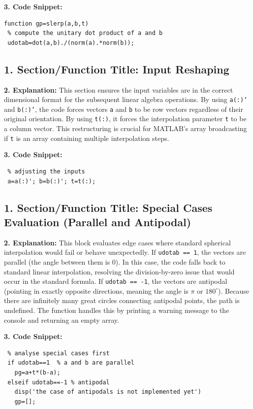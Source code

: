 \textbf{3. Code Snippet:}
\begin{lstlisting}
function gp=slerp(a,b,t)
 % compute the unitary dot product of a and b
 udotab=dot(a,b)./(norm(a).*norm(b));
\end{lstlisting}


\subsection*{1. Section/Function Title: Input Reshaping}
\textbf{2. Explanation:} This section ensures the input variables are in the correct dimensional format for the subsequent linear algebra operations. By using \texttt{a(:)'} and \texttt{b(:)'}, the code forces vectors \texttt{a} and \texttt{b} to be row vectors regardless of their original orientation. By using \texttt{t(:)}, it forces the interpolation parameter \texttt{t} to be a column vector. This restructuring is crucial for MATLAB's array broadcasting if \texttt{t} is an array containing multiple interpolation steps.

\textbf{3. Code Snippet:}
\begin{lstlisting}
 % adjusting the inputs
 a=a(:)'; b=b(:)'; t=t(:);
\end{lstlisting}


\subsection*{1. Section/Function Title: Special Cases Evaluation (Parallel and Antipodal)}
\textbf{2. Explanation:} This block evaluates edge cases where standard spherical interpolation would fail or behave unexpectedly. 
If \texttt{udotab == 1}, the vectors are parallel (the angle between them is $0$). In this case, the code falls back to standard linear interpolation, resolving the division-by-zero issue that would occur in the standard formula. 
If \texttt{udotab == -1}, the vectors are antipodal (pointing in exactly opposite directions, meaning the angle is $\pi$ or $180^\circ$). Because there are infinitely many great circles connecting antipodal points, the path is undefined. The function handles this by printing a warning message to the console and returning an empty array.

\textbf{3. Code Snippet:}
\begin{lstlisting}
 % analyse special cases first
 if udotab==1  % a and b are parallel
   pg=a+t*(b-a);
 elseif udotab==-1 % antipodal
   disp('the case of antipodals is not implemented yet')
   gp=[];
\end{lstlisting}


